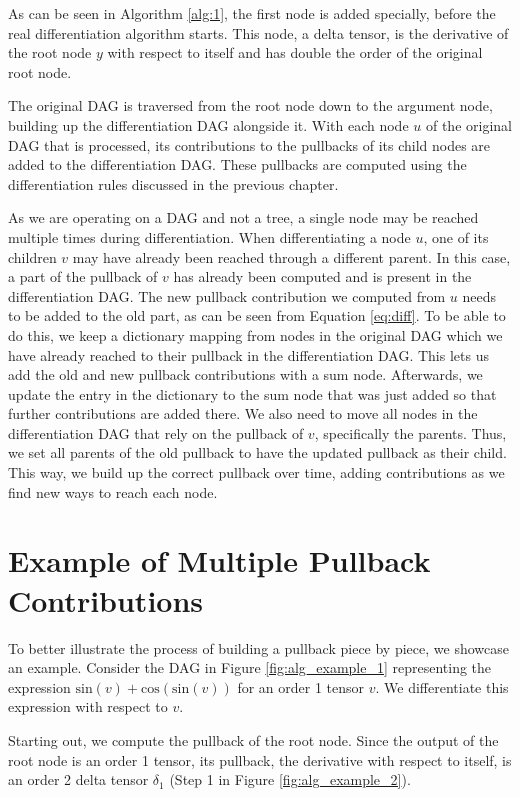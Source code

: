 \documentclass[12pt, a4paper]{report}
\begin{document}
As can be seen in Algorithm \ref{alg:1}, the first node is added specially, before the real differentiation algorithm starts.
This node, a delta tensor, is the derivative of the root node $y$ with respect to itself and has double the order of the original root node.

The original DAG is traversed from the root node down to the argument node, building up the differentiation DAG alongside it.
With each node $u$ of the original DAG that is processed, its contributions to the pullbacks of its child nodes are added to the differentiation DAG.
These pullbacks are computed using the differentiation rules discussed in the previous chapter.

As we are operating on a DAG and not a tree, a single node may be reached multiple times during differentiation.
When differentiating a node $u$, one of its children $v$ may have already been reached through a different parent.
In this case, a part of the pullback of $v$ has already been computed and is present in the differentiation DAG.
The new pullback contribution we computed from $u$ needs to be added to the old part, as can be seen from Equation \ref{eq:diff}.
To be able to do this, we keep a dictionary mapping from nodes in the original DAG which we have already reached to their pullback in the differentiation DAG.
This lets us add the old and new pullback contributions with a sum node.
Afterwards, we update the entry in the dictionary to the sum node that was just added so that further contributions are added there.
We also need to move all nodes in the differentiation DAG that rely on the pullback of $v$, specifically the parents.
Thus, we set all parents of the old pullback to have the updated pullback as their child.
This way, we build up the correct pullback over time, adding contributions as we find new ways to reach each node.

\FloatBarrier
\section{Example of Multiple Pullback Contributions}
To better illustrate the process of building a pullback piece by piece, we showcase an example.
Consider the DAG in Figure \ref{fig:alg_example_1} representing the expression $\text{sin}(v) + \text{cos}(\text{sin}(v))$ for an order 1 tensor $v$.
We differentiate this expression with respect to $v$.

Starting out, we compute the pullback of the root node.
Since the output of the root node is an order 1 tensor, its pullback, the derivative with respect to itself, is an order 2 delta tensor $\delta_1$ (Step 1 in Figure \ref{fig:alg_example_2}).
\end{document}
